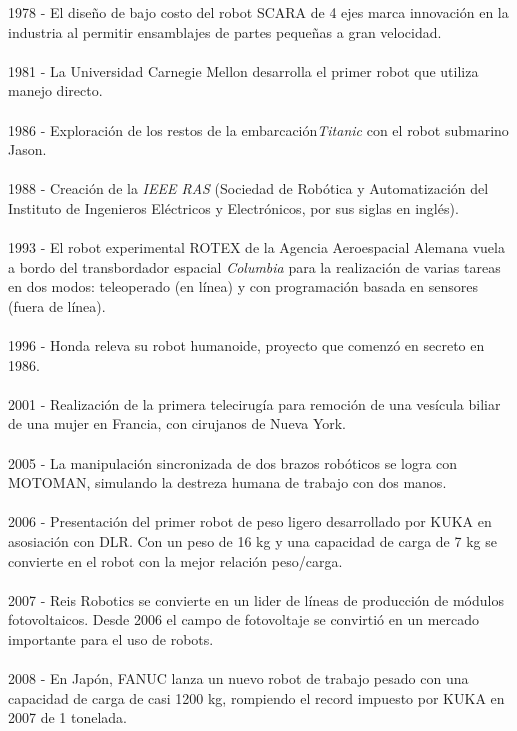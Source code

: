 1978 - El diseño de bajo costo del robot SCARA de 4 ejes marca innovación en la industria al permitir ensamblajes de partes pequeñas a gran velocidad.\\\\
1981 - La Universidad Carnegie Mellon desarrolla el primer robot que utiliza manejo directo.\\\\
1986 - Exploración de los restos de la embarcación\textit{Titanic} con el robot submarino Jason.\\\\
1988 - Creación de la \textit{IEEE RAS} (Sociedad de Robótica y Automatización del Instituto de Ingenieros Eléctricos y Electrónicos, por sus siglas en inglés).\\\\
1993 - El robot experimental ROTEX de la Agencia Aeroespacial Alemana vuela a bordo del transbordador espacial \textit{Columbia} para la realización de varias tareas en dos modos: teleoperado (en línea) y con programación basada en sensores (fuera de línea).\\\\
1996 - Honda releva su robot humanoide, proyecto que comenzó en secreto en 1986.\\\\
2001 - Realización de la primera telecirugía para remoción de una vesícula biliar de una mujer en Francia, con cirujanos de Nueva York.\\\\
2005 - La manipulación sincronizada de dos brazos robóticos se logra con MOTOMAN, simulando la destreza humana de trabajo con dos manos.\\\\
2006 - Presentación del primer robot de peso ligero desarrollado por KUKA en asosiación con DLR. Con un peso de 16 kg y una capacidad de carga de 7 kg se convierte en el robot con la mejor relación peso/carga.\\\\
2007 - Reis Robotics se convierte en un lider de líneas de producción de módulos fotovoltaicos. Desde 2006 el campo de fotovoltaje se convirtió en un mercado importante para el uso de robots.\\\\
2008 - En Japón, FANUC lanza un nuevo robot de trabajo pesado con una capacidad de carga de casi 1200 kg, rompiendo el record impuesto por KUKA en 2007 de 1 tonelada.\\\\
